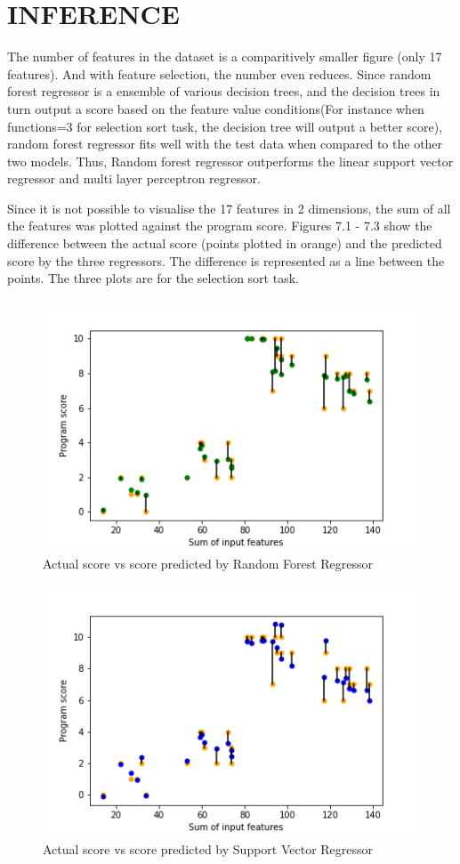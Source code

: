 \section{INFERENCE}

The number of features in the dataset is a comparitively smaller figure (only 17 features). And with feature selection, the number even reduces. Since random forest regressor is a ensemble of various decision trees, and the decision trees in turn output a score based on the feature value conditions(For instance when functions=3 for selection sort task, the decision tree will output a better score), random forest regressor fits well with the test data when compared to the other two models. Thus, Random forest regressor outperforms the linear support vector regressor and multi layer perceptron regressor. 

Since it is not possible to visualise the 17 features in 2 dimensions, the sum of all the features was plotted against the program score.
Figures 7.1 - 7.3 show the difference between the actual score (points plotted in orange) and the predicted score by the three regressors. The difference is represented as a line between the points. The three plots are for the selection sort task.

\begin{figure}[H]
\centering
\includegraphics[scale=1.0]{./figures/ss_rf.png}
\caption{Actual score vs score predicted by Random Forest Regressor}
\label{fig_rf}
\end{figure}

\begin{figure}[H]
\centering
\includegraphics[scale=1.0]{./figures/ss_svr.png}
\caption{Actual score vs score predicted by Support Vector Regressor}
\label{fig_rf}
\end{figure}

